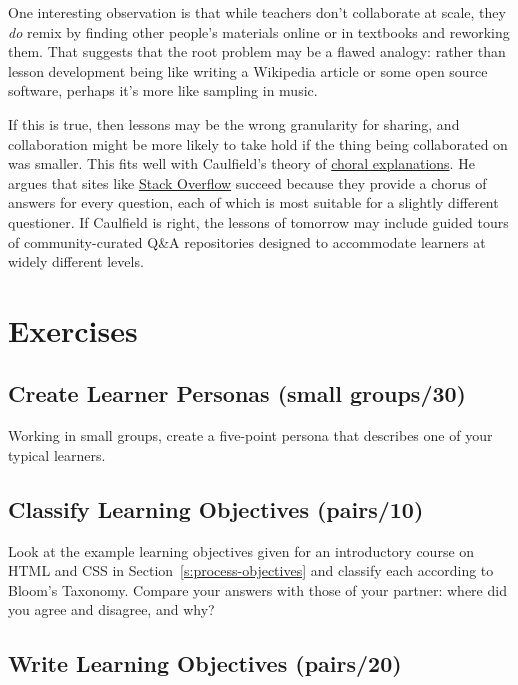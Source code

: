 One interesting observation is that while teachers don't collaborate
at scale, they \emph{do} remix by finding other people's materials online
or in textbooks and reworking them. That suggests that the root
problem may be a flawed analogy: rather than lesson development being
like writing a Wikipedia article or some open source software, perhaps
it's more like sampling in music.

If this is true, then lessons may be the wrong granularity for
sharing, and collaboration might be more likely to take hold if the
thing being collaborated on was smaller. This fits well with
Caulfield's theory of \href{https://hapgood.us/2016/05/13/choral-explanations/}{choral explanations}. He
argues that sites like \href{https://stackoverflow.com/}{Stack Overflow} succeed
because they provide a chorus of answers for every question, each of
which is most suitable for a slightly different questioner. If
Caulfield is right, the lessons of tomorrow may include guided tours
of community-curated Q\&A repositories designed to accommodate learners
at widely different levels.

\section{Exercises}\label{s:process-exercises}

\subsection*{Create Learner Personas (small groups/30)}

Working in small groups, create a five-point persona that describes one
of your typical learners.

\subsection*{Classify Learning Objectives (pairs/10)}

Look at the example learning objectives given for an introductory course
on HTML and CSS in Section~\ref{s:process-objectives} and classify each
according to Bloom's Taxonomy. Compare your answers with those of your
partner: where did you agree and disagree, and why?

\subsection*{Write Learning Objectives (pairs/20)}

